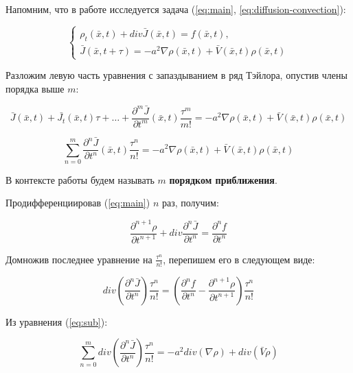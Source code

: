 Напомним, что в работе исследуется задача (\ref{eq:main}, \ref{eq:diffusion-convection}):

\begin{equation}
\left\{
\begin{aligned}
\rho_t(\bar{x},t) + div \bar{J}(\bar{x},t) = f(\bar{x},t),\\
\bar{J}(\bar{x},t+\tau) = -a^2 \nabla \rho(\bar{x},t) + \bar{V}(\bar{x},t) \rho(\bar{x},t)
\end{aligned}
\right.
\end{equation}

Разложим левую часть уравнения с запаздыванием в ряд Тэйлора, опустив члены порядка выше $m$:

\begin{equation}
\bar{J}(\bar{x},t) + \bar{J_t}(\bar{x},t) \tau + \dots + \dfrac{\partial^m \bar{J}}{\partial t^m}(\bar{x},t) \dfrac{\tau^m}{m!} = -a^2 \nabla \rho(\bar{x},t) + \bar{V}(\bar{x},t) \rho(\bar{x},t)
\end{equation}

\begin{equation}\label{eq:sub}
\sum\limits_{n=0}^{m} \dfrac{\partial^n \bar{J}}{\partial t^n}(\bar{x},t) \dfrac{\tau^n}{n!} = -a^2 \nabla \rho(\bar{x},t) + \bar{V}(\bar{x},t) \rho(\bar{x},t)
\end{equation}

В контексте работы будем называть $m$ \textbf{порядком приближения}.

Продифференциировав (\ref{eq:main}) $n$ раз, получим:

\begin{equation}
\dfrac{\partial^{n+1} \rho}{\partial t^{n+1}} + div \dfrac{\partial^n \bar{J}}{\partial t^n} = \dfrac{\partial^n f}{\partial t^n}
\end{equation}

Домножив последнее уравнение на $\frac{\tau^n}{n!}$, перепишем его в следующем виде:

\begin{equation}\label{eq:div}
div \left( \dfrac{\partial^n \bar{J}}{\partial t^n} \right) \dfrac{\tau^n}{n!} = \left(\dfrac{\partial^n f}{\partial t^n} - \dfrac{\partial^{n+1} \rho}{\partial t^{n+1}} \right) \dfrac{\tau^n}{n!}
\end{equation}

Из уравнения (\ref{eq:sub}):

\begin{equation}
\sum\limits_{n=0}^{m} div \left(\dfrac{\partial^n \bar{J}}{\partial t^n} \right) \dfrac{\tau^n}{n!} = -a^2 div(\nabla \rho) + div(\bar{V} \rho)
\end{equation}

